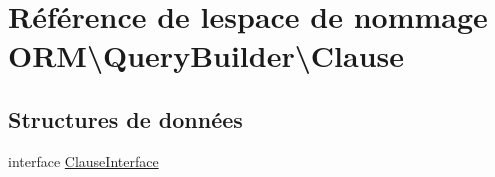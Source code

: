 \hypertarget{namespace_o_r_m_1_1_query_builder_1_1_clause}{}\section{Référence de l\textquotesingle{}espace de nommage O\+RM\textbackslash{}Query\+Builder\textbackslash{}Clause}
\label{namespace_o_r_m_1_1_query_builder_1_1_clause}
\subsection*{Structures de données}
\begin{DoxyCompactItemize}
\item 
interface \hyperlink{interface_o_r_m_1_1_query_builder_1_1_clause_1_1_clause_interface}{Clause\+Interface}
\end{DoxyCompactItemize}
